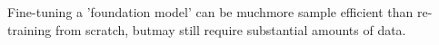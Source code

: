 \documentclass[preview]{standalone}
\begin{document}
\begin{center}
Fine-tuning a 'foundation model' can be muchmore sample efficient than 
re-training from scratch, butmay still require substantial amounts of data.
\end{center}
\end{document}
